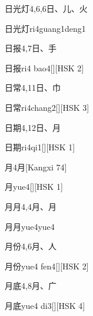 \begin{entry}{日光灯}{4,6,6}{⽇、⼉、⽕}
  \begin{phonetics}{日光灯}{ri4guang1deng1}
  \end{phonetics}
\end{entry}

\begin{entry}{日报}{4,7}{⽇、⼿}
  \begin{phonetics}{日报}{ri4 bao4}[][HSK 2]
  \end{phonetics}
\end{entry}

\begin{entry}{日常}{4,11}{⽇、⼱}
  \begin{phonetics}{日常}{ri4chang2}[][HSK 3]
  \end{phonetics}
\end{entry}

\begin{entry}{日期}{4,12}{⽇、⽉}
  \begin{phonetics}{日期}{ri4qi1}[][HSK 1]
  \end{phonetics}
\end{entry}

\begin{entry}{月}{4}{⽉}[Kangxi 74]
  \begin{phonetics}{月}{yue4}[][HSK 1]
  \end{phonetics}
\end{entry}

\begin{entry}{月月}{4,4}{⽉、⽉}
  \begin{phonetics}{月月}{yue4yue4}
  \end{phonetics}
\end{entry}

\begin{entry}{月份}{4,6}{⽉、⼈}
  \begin{phonetics}{月份}{yue4 fen4}[][HSK 2]
  \end{phonetics}
\end{entry}

\begin{entry}{月底}{4,8}{⽉、⼴}
  \begin{phonetics}{月底}{yue4 di3}[][HSK 4]
  \end{phonetics}
\end{entry}

